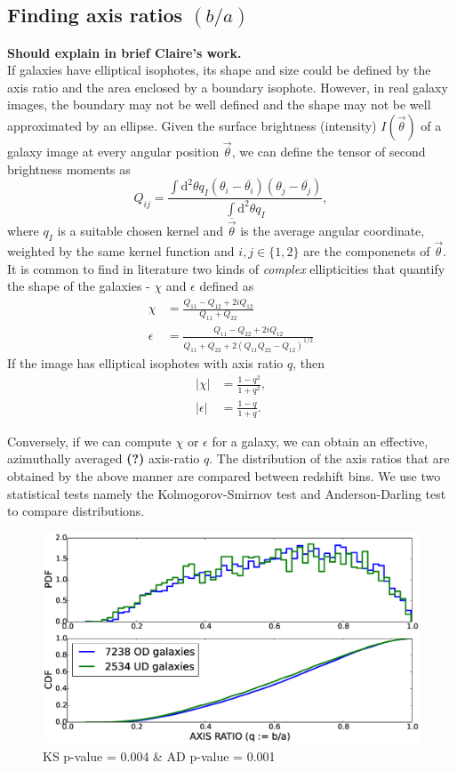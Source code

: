 \documentclass[twocolumn,useAMS,usenatbib]{mn2e}
\newcommand{\rmd}{\mathrm{d}}
\begin{document}
\subsection{Finding axis ratios $(b/a)$}
\label{s:axisratio}
{\bf Should explain in brief Claire's work.} \\
If galaxies have elliptical isophotes, its shape and size could be defined by the axis ratio and the area enclosed by a boundary isophote. However, in real galaxy images,
the boundary may not be well defined and the shape may not be well approximated by an ellipse. Given the surface brightness (intensity) $I(\vec{\theta})$ of a galaxy image at every angular position $\vec{\theta}$,
we can define the tensor of second brightness moments as
\begin{equation}
 Q_{ij} = \frac{\int\rmd^2\theta q_I (\theta_i - \overline{\theta_i})(\theta_j - \overline{\theta_j})}{\int\rmd^2\theta q_I},
\end{equation}
where $q_I$ is a suitable chosen kernel and $\overline{\vec{\theta}}$ is the average angular coordinate, weighted by the same kernel function and $i,j\in\lbrace 1,2 \rbrace$ are the componenets of $\vec{\theta}$.
It is common to find in literature two kinds of \emph{complex }ellipticities that quantify the shape of the galaxies - $\chi$ and $\epsilon$ defined as
\begin{align}
 \chi &= \frac{Q_{11}-Q_{12}+2iQ_{12}}{Q_{11}+Q_{22}} \\ \epsilon &= \frac{Q_{11}-Q_{22}+2iQ_{12}}{Q_{11}+Q_{22}+2(Q_{11}Q_{22}-Q_{12})^{1/2}}
\end{align}
If the image has elliptical isophotes with axis ratio $q$, then 
\begin{align}
 |\chi| &= \frac{1-q^2}{1+q^2}, \\ |\epsilon| &= \frac{1-q}{1+q}. 
\end{align}

Conversely, if we can compute $\chi$ or $\epsilon$ for a galaxy, we can obtain an effective, azimuthally averaged {\bf(?)} axis-ratio $q$. 
The distribution of the axis ratios that are obtained by the above manner are compared between redshift bins. We use two statistical tests namely the Kolmogorov-Smirnov test and Anderson-Darling test to compare distributions.
\begin{figure}
 \centering
 \includegraphics[width=\columnwidth]{axis_ratio_all.eps}
 \caption{KS p-value = 0.004 \& AD p-value = 0.001}
 \label{fig:axisratio_all}
\end{figure}
\end{document}
